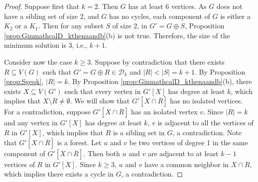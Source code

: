 \documentclass[10pt,a4paper]{amsart}
\begin{document}
\begin{proof}
Suppose first that $k=2$. Then $G$ has at least 6 vertices.
 As $G$ does not have a sibling set of size 2, and $G$ has no cycles, 
each component of $G$ is either a $K_2$ or a $K_1$.
Then for any subset $S$ of size 2, in $G'=G\oplus S$,
Proposition \ref{prop:GinmathcalD_kthenaandb}(b) is not true.
Therefore, the size of the minimum solution is 3, i.e., $k+1$.


Consider now the case $k\geq 3$.
Suppose by contradiction that there exists $R \subseteq V(G)$ such that $G'=G \oplus R \in \mathcal{D}_k$ and $|R| < |S| = k+1$.
By Proposition \ref{prop:Sgeqk}, $|R|=k$.
By Proposition \ref{prop:GinmathcalD_kthenaandb}(b), there exists
    $X \subseteq V(G')$  such that every vertex in $G'[X]$ has degree at least $k$, which implies 
    that $X \setminus R \neq \emptyset$.
    We will show that $G' [X \cap \overline{R}]$ has no isolated vertices.
For a contradiction, suppose $G' [X \cap \overline{R}]$ has an isolated vertex $v$.
Since $|R|=k$ and any vertex in $G'[X]$ has degree at least $k$, $v$ is 
adjacent to all the vertices of $R$ in $G'[X]$, which implies that $R$ is a sibling set in $G$, a contradiction.
Note that 
$G' [X \cap \overline{R}]$ is a forest.
Let $u$ and $v$ be two vertices of degree 1 in the same component of $G' [X \cap \overline{R}]$.
Then both $u$ and $v$ are adjacent to at least $k-1$ vertices of
$R$ in $G'[X]$. Since $k\geq 3$, $u$ and $v$ have a common neighbor in $X\cap R$, 
which implies there exists a cycle in $G$, a contradiction.
\end{proof}
\end{document}
